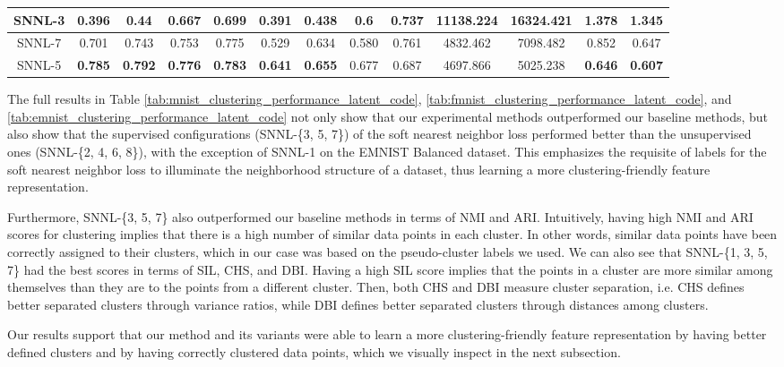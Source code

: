 \documentclass[conference]{IEEEtran}
\begin{document}
\begin{table*}[htb]
\begin{tabular}{| *{13}{c|}}
         \hline
         SNNL-3 & 0.396 & 0.44 & 0.667 & 0.699 & 0.391 & 0.438 & 0.6 & 0.737 & 11138.224 & 16324.421 & 1.378 & 1.345\\
         \hline
         SNNL-7 & 0.701 & 0.743 & 0.753 & 0.775 & 0.529 & 0.634 & 0.580 & 0.761 & 4832.462 & 7098.482 & 0.852 & 0.647\\
         \hline
         SNNL-5 & \textbf{0.785} & \textbf{0.792} & \textbf{0.776} & \textbf{0.783} & \textbf{0.641} & \textbf{0.655} & 0.677 & 0.687 & 4697.866 & 5025.238 & \textbf{0.646} & \textbf{0.607}\\
         \hline
    \end{tabular}
\end{table*}

The full results in Table \ref{tab:mnist_clustering_performance_latent_code}, \ref{tab:fmnist_clustering_performance_latent_code}, and \ref{tab:emnist_clustering_performance_latent_code} not only show that our experimental methods outperformed our baseline methods, but also show that the supervised configurations (SNNL-\{3, 5, 7\}) of the soft nearest neighbor loss performed better than the unsupervised ones (SNNL-\{2, 4, 6, 8\}), with the exception of SNNL-1 on the EMNIST Balanced dataset. This emphasizes the requisite of labels for the soft nearest neighbor loss to illuminate the neighborhood structure of a dataset, thus learning a more clustering-friendly feature representation.

Furthermore, SNNL-\{3, 5, 7\} also outperformed our baseline methods in terms of NMI and ARI. Intuitively, having high NMI and ARI scores for clustering implies that there is a high number of similar data points in each cluster. In other words, similar data points have been correctly assigned to their clusters, which in our case was based on the pseudo-cluster labels we used. We can also see that SNNL-\{1, 3, 5, 7\} had the best scores in terms of SIL, CHS, and DBI. Having a high SIL score implies that the points in a cluster are more similar among themselves than they are to the points from a different cluster. Then, both CHS and DBI measure cluster separation, i.e. CHS defines better separated clusters through variance ratios, while DBI defines better separated clusters through distances among clusters.

Our results support that our method and its variants were able to learn a more clustering-friendly feature representation by having better defined clusters and by having correctly clustered data points, which we visually inspect in the next subsection.
\end{document}
